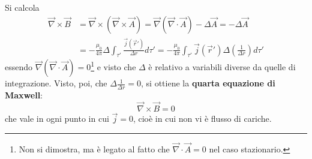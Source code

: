 \documentclass[a4paper]{scrartcl}
\numberwithin{equation}{subsection}
\theoremstyle{style1}
\begin{document}
Si calcola
\begin{equation}
	\begin{split}
		\vec{\nabla }\times \vec{B} &= \vec{\nabla }\times (\vec{\nabla }\times \vec{A}) = \vec{\nabla }(\vec{\nabla }\cdot \vec{A}) - \Delta  \vec{A} = -\Delta \vec{A}\\
					    &= - \frac{\mu_0}{4\pi}\Delta  \int_{\tau '} \frac{\vec{j}(\vec{r}')}{\Delta r}d\tau '= -\frac{\mu_0}{4 \pi} \int_{\tau '} \vec{j}(\vec{r}') \Delta  \left(\frac{1}{\Delta r}\right) d\tau '
	\end{split}
\end{equation}
essendo $\vec{\nabla }(\vec{\nabla }\cdot \vec{A}) =0 $\footnote{Non si dimostra, ma \`e legato al fatto che $\vec{\nabla }\cdot\vec{A} =0 $ nel caso stazionario.} e visto che $\Delta $ \`e relativo a variabili diverse da quelle di integrazione. Visto, poi, che $\Delta  \frac{1}{\Delta r} = 0$, si ottiene la \textbf{quarta equazione di Maxwell}:
\begin{equation}
	\vec{\nabla }\times \vec{B} = 0
\end{equation}
che vale in ogni punto in cui $\vec{j}=0$, cio\`e in cui non vi \`e flusso di cariche. 
\end{document}
